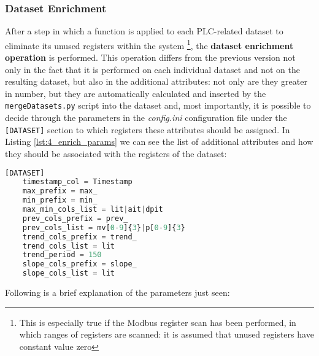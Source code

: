 \subsubsection{Dataset Enrichment}
\label{subsubsec:4_dataset_enrichment}
After a step in which a function is applied to each PLC-related dataset to eliminate its unused registers within the system \footnote{This is especially true if the Modbus register scan has been performed, in which ranges of registers are scanned: it is assumed that unused registers have constant value zero}, the \textbf{dataset enrichment operation} is performed.\newline
This operation differs from the previous version not only in the fact that it is performed on each individual dataset and not on the resulting dataset, but also in the additional attributes: not only are they greater in number, but they are automatically calculated and inserted by the \texttt{mergeDatasets.py} script into the dataset and, most importantly, it is possible to decide through the parameters in the \textit{config.ini} configuration file under the \texttt{[DATASET]} section to which registers these attributes should be assigned. \newline
In Listing \ref{lst:4_enrich_params} we can see the list of additional attributes and how they should be associated with the registers of the dataset:

\begin{lstlisting}[language=Python,numbers=none,caption={\texttt{config.ini} parameters for dataset enriching},label=lst:4_enrich_params]
	[DATASET]
	timestamp_col = Timestamp
	max_prefix = max_
	min_prefix = min_
	max_min_cols_list = lit|ait|dpit
	prev_cols_prefix = prev_
	prev_cols_list = mv[0-9]{3}|p[0-9]{3}
	trend_cols_prefix = trend_
	trend_cols_list = lit
	trend_period = 150
	slope_cols_prefix = slope_
	slope_cols_list = lit
\end{lstlisting}
Following is a brief explanation of the parameters just seen:

